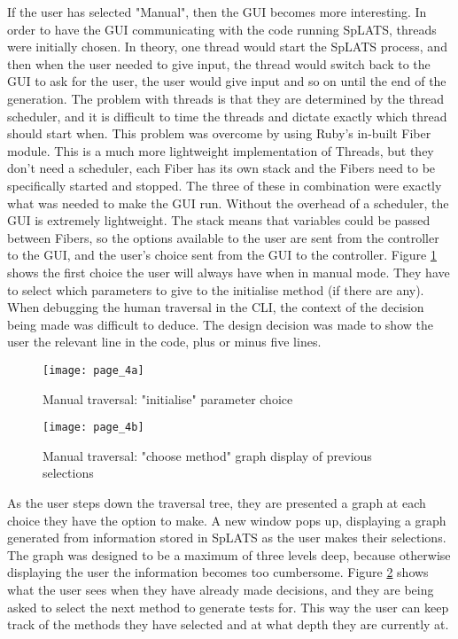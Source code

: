   If the user has selected "Manual", then the GUI becomes more interesting. In order to have the GUI communicating with the code running SpLATS, threads were initially chosen. In theory, one thread would start the SpLATS process, and then when the user needed to give input, the thread would switch back to the GUI to ask for the user, the user would give input and so on until the end of the generation. The problem with threads is that they are determined by the thread scheduler, and it is difficult to time the threads and dictate exactly which thread should start when. This problem was overcome by using Ruby's in-built Fiber module. This is a much more lightweight implementation of Threads, but they don't need a scheduler, each Fiber has its own stack and the Fibers need to be specifically started and stopped. The three of these in combination were exactly what was needed to make the GUI run. Without the overhead of a scheduler, the GUI is extremely lightweight. The stack means that variables could be passed between Fibers, so the options available to the user are sent from the controller to the GUI, and the user's choice sent from the GUI to the controller. Figure \ref{fig:GUI_Page4a} shows the first choice the user will always have when in manual mode. They have to select which parameters to give to the initialise method (if there are any). When debugging the human traversal in the CLI, the context of the decision being made was difficult to deduce. The design decision was made to show the user the relevant line in the code, plus or minus five lines.
  
  \begin{figure}
    \centering
    \texttt{[image: page\_4a]}
    \caption{Manual traversal: "initialise" parameter choice}
    \label{fig:GUI_Page4a}
  \end{figure}
  
  \begin{figure}
    \centering
    \texttt{[image: page\_4b]}
    \caption{Manual traversal: "choose method" graph display of previous selections}
    \label{fig:GUI_Page4b}
  \end{figure}
  
  As the user steps down the traversal tree, they are presented a graph at each choice they have the option to make. A new window pops up, displaying a graph generated from information stored in SpLATS as the user makes their selections. The graph was designed to be a maximum of three levels deep, because otherwise displaying the user the information becomes too cumbersome. Figure \ref{fig:GUI_Page4b} shows what the user sees when they have already made decisions, and they are being asked to select the next method to generate tests for. This way the user can keep track of the methods they have selected and at what depth they are currently at.

